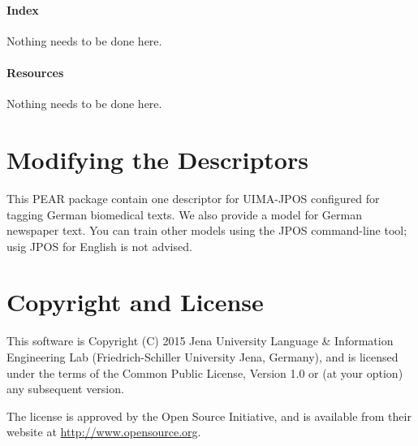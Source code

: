 \documentclass[11pt,a4paper,halfparskip]{scrartcl}
\begin{document}
\paragraph{Index}

Nothing needs to be done here.

\paragraph{Resources}

Nothing needs to be done here.


\section{Modifying the Descriptors}

This PEAR package contain one descriptor for UIMA-JPOS configured for tagging German biomedical texts. We also provide a model for German newspaper text. You can train other models using the JPOS command-line tool; usig JPOS for English is not advised.

\section{Copyright and License}

This software is Copyright (C) 2015 Jena University Language \& Information
Engineering Lab (Friedrich-Schiller University Jena, Germany), and is
licensed under the terms of the Common Public License, Version 1.0 or (at
your option) any subsequent version.

The license is approved by the Open Source Initiative, and is
available from their website at \url{http://www.opensource.org}.



\end{document}
